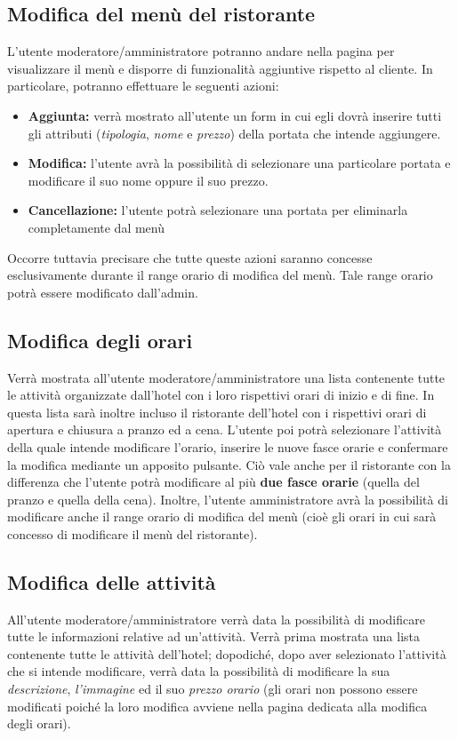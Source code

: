 \documentclass [a4paper, 12pt]{book}
\begin{document}
\subsection{Modifica del menù del ristorante}
\label{ModificaMenu}
L'utente moderatore/amministratore potranno andare nella pagina per visualizzare il menù e disporre di funzionalità aggiuntive rispetto al cliente. In particolare, potranno effettuare le seguenti azioni:
\begin{itemize}
\item \textbf{Aggiunta:} verrà mostrato all'utente un form in cui egli dovrà inserire tutti gli attributi (\textit{tipologia}, \textit{nome} e \textit{prezzo}) della portata che intende aggiungere.
\item \textbf{Modifica:} l'utente avrà la possibilità di selezionare una particolare portata e modificare il suo nome oppure il suo prezzo.
\item \textbf{Cancellazione:} l'utente potrà selezionare una portata per eliminarla completamente dal menù 
\end{itemize} 
Occorre tuttavia precisare che tutte queste azioni saranno concesse esclusivamente  durante il range orario di modifica del menù. Tale range orario potrà essere modificato dall'admin.
\medskip

\subsection{Modifica degli orari}
Verrà mostrata all'utente moderatore/amministratore una lista contenente tutte le attività organizzate dall'hotel con i loro rispettivi orari di inizio e di fine. In questa lista sarà inoltre incluso il ristorante dell'hotel con i rispettivi orari di apertura e chiusura a pranzo ed a cena. L'utente poi potrà selezionare l'attività della quale intende modificare l'orario, inserire le nuove fasce orarie e confermare la modifica mediante un apposito pulsante. Ciò vale anche per il ristorante con la differenza che l'utente potrà modificare al più \textbf{due fasce orarie} (quella del pranzo e quella della cena). Inoltre, l'utente amministratore avrà la possibilità di modificare anche il range orario di modifica del menù (cioè gli orari in cui sarà concesso di modificare il menù del ristorante).

\medskip

\subsection{Modifica delle attività}
All'utente moderatore/amministratore verrà data la possibilità di modificare tutte le informazioni relative ad un'attività. Verrà prima mostrata una lista contenente tutte le attività dell'hotel; dopodiché, dopo aver selezionato l'attività che si intende modificare, verrà data la possibilità di modificare la sua \textit{descrizione}, \textit{l'immagine} ed il suo \textit{prezzo orario} (gli orari non possono essere modificati poiché la loro modifica avviene nella pagina dedicata alla modifica degli orari).
\end{document}
